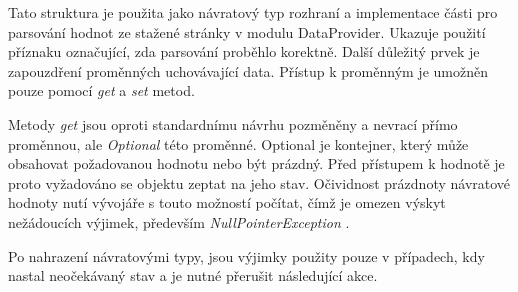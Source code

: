 \documentclass[thesis=B,czech]{FITthesis}[2012/06/26]
\begin{document}
Tato struktura je použita jako návratový typ rozhraní a implementace části pro parsování hodnot 
ze stažené stránky v modulu DataProvider. Ukazuje použití příznaku označující, zda parsování proběhlo korektně. Další důležitý prvek
je zapouzdření proměnných uchovávající data.\cite{encapsulation} Přístup k proměnným je umožněn pouze pomocí \textit{get} a \textit{set} metod.
\par
Metody \textit{get} jsou oproti standardnímu návrhu pozměněny a nevrací přímo proměnnou, ale \textit{Optional} této proměnné.
Optional je kontejner, který může obsahovat požadovanou hodnotu \cite{optional} nebo být prázdný. Před přístupem k hodnotě je proto vyžadováno se objektu zeptat na jeho stav. Očividnost prázdnoty návratové hodnoty nutí vývojáře s touto možností počítat, čímž 
je omezen výskyt nežádoucích výjimek, především \textit{NullPointerException} \cite{nullPointerException}.
\par
Po nahrazení návratovými typy, jsou výjimky použity pouze v případech, kdy nastal neočekávaný stav a je nutné přerušit následující akce.
\end{document}
